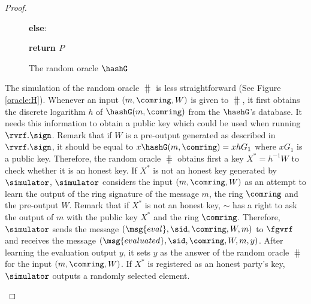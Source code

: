 \begin{proof}
\begin{itemize}
\begin{figure}
{{					
					
					
					
					
					\textbf{else}:
					
					
					
					\textbf{return $ P $}
					
			}}	
			\caption{The random oracle $ \hashG $}
			\label{oracle:Hg}
		\end{figure}
		
		The simulation of the random oracle $ \hash $ is less straightforward (See Figure \ref{oracle:H}). Whenever an input $ (m, \comring, W) $ is given to $ \hash $, it first obtains the discrete logarithm $ h $ of $ \hashG(m, \comring) $ from the $ \hashG $'s database. It needs this information to obtain a public key  which could be used when running $ \rvrf.\sign $. Remark that if $ W $ is a pre-output generated as described in $ \rvrf.\sign $, it should be equal to $ x\hashG(m, \comring)= xhG_1 $  where $ xG_1 $ is a public key. Therefore, the random oracle $ \hash $ obtains first  a  key $ X^* = h^{-1}W $ to check whether it is an honest key. 
		If $ X^*$ is not an honest key generated by $ \simulator $, $ \simulator $ considers the input $ (m,\comring,W) $ as an attempt to learn the output of the ring signature of the message $ m $, the ring $ \comring $ and the pre-output $ W $.
		Remark that if $ X^* $ is not an honest key, $ \sim $ has a right to ask the output of $ m $ with the public key $ X^* $ and the ring $ \comring $. Therefore, $ \simulator $ sends the message $ (\msg{eval}, \sid, \comring,W,m) $ to $ \fgvrf $ and receives the message $ (\msg{evaluated}, \sid, \comring,W,m,y) $.
		After learning the evaluation output $ y $, it sets $ y $ as the answer of the random oracle $ \hash $  for the input $ (m, \comring, W) $. 
		If $ X^* $ is registered as an honest party's key, $ \simulator $ outputs a randomly selected element. 
		

\end{itemize}
\end{proof}
